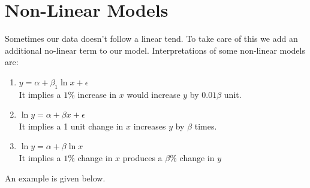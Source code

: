 \documentclass[notoc]{tufte-book}
\begin{document}
\section{Non-Linear Models}
Sometimes our data doesn't follow a linear tend. To take care of this we add an additional 
no-linear term to our model. Interpretations of some non-linear models are:
\begin{enumerate}
    \item $y=\alpha+\beta_1\ln x+\epsilon$\\
    It implies a $1\%$ increase in $x$ would increase $y$ by $0.01\beta$ unit.
    \item $\ln y=\alpha+\beta x+\epsilon$\\
    It implies a 1 unit change in $x$ increases $y$ by $\beta$ times.
    \item $\ln y=\alpha+\beta\ln x$\\
    It implies a $1\%$ change in $x$ produces a $\beta\%$ change in $y$ 
\end{enumerate}
An example is given below.
\end{document}
